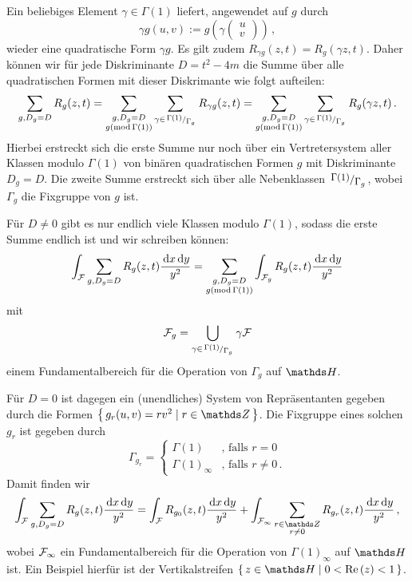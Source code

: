 \begin{bewe}
Ein beliebiges Element $\gamma \in \Gamma(1)$ liefert, angewendet auf $g$ durch
\[
	\gamma g (u, v) := g \left( \gamma \begin{pmatrix}u\\v\end{pmatrix} \right)
	\,,
\]
wieder eine quadratische Form $\gamma g$. Es gilt zudem $R_{\gamma g} (z, t) = R_g (\gamma z, t)$. Daher können wir für jede Diskriminante $D = t^2 - 4m$ die Summe über alle quadratischen Formen mit dieser Diskrimante wie folgt aufteilen:
\[
	\sum_{g, D_g = D} R_g (z, t) = \sum_{\substack{g, D_g = D \\ g (\operatorname{mod} \Gamma(1))}} \sum_{\gamma \in \modulo {\Gamma(1)} {\Gamma_g}} R_{\gamma g} (z,t) = \sum_{\substack{g, D_g = D \\ g (\operatorname{mod} \Gamma(1))}} \sum_{\gamma \in \modulo {\Gamma(1)} {\Gamma_g}} R_g (\gamma z,t)
	\,.
\]
Hierbei erstreckt sich die erste Summe nur noch über ein Vertretersystem aller Klassen modulo $\Gamma(1)$ von binären quadratischen Formen $g$ mit Diskriminante $D_g = D$. Die zweite Summe erstreckt sich über alle Nebenklassen $\modulo {\Gamma(1)}{\Gamma_g}$, wobei $\Gamma_g$ die Fixgruppe von $g$ ist. 

Für $D \neq 0$ gibt es nur endlich viele Klassen modulo $\Gamma(1)$, sodass die erste Summe endlich ist und wir schreiben können:
\begin{equation}\label{eq:intFsumGforDneq0}
	\int_{\mathcal{F}} \sum_{g, D_g = D} R_g(z,t) \frac{\,\mathrm{d} x \,\mathrm{d} y}{y^2} = \sum_{\substack{g, D_g = D \\ g (\operatorname{mod} \Gamma(1))}} \int_{\mathcal{F}_g} R_g (z,t) \frac{\,\mathrm{d} x \,\mathrm{d} y}{y^2}
\end{equation}
mit 
\[
	\F_g = \bigcup_{\gamma \in \modulo {\Gamma(1)}{\Gamma_g}} \gamma \F
\]
einem Fundamentalbereich für die Operation von $\Gamma_g$ auf $\HH$.

Für $D = 0$ ist dagegen ein (unendliches) System von Repräsentanten gegeben durch die Formen $\Set {g_r(u,v) = rv^2 \mid r \in \ZZ }$. Die Fixgruppe eines solchen $g_r$ ist gegeben durch
\[
	\Gamma_{g_r} = \begin{cases} \Gamma(1) &\text{, falls } r = 0\\ \Gamma(1)_\infty &\text{, falls } r \neq 0 \,. \end{cases}
\]
Damit finden wir
\begin{equation}\label{eq:intFsumGforD=0}
	\int_\F \sum_{g, D_g = D} R_g(z,t) \frac{\opd x \opd y}{y^2} = \int_\F R_{g_0} (z,t) \frac{\opd x \opd y}{y^2} + \int_{\F_\infty} \sum_{\substack{r \in \ZZ \\ r \neq 0}} R_{g_r}(z,t) \frac{\opd x \opd y}{y^2}
	\,,
\end{equation}
wobei $\mathcal{F}_\infty$ ein Fundamentalbereich für die Operation von $\Gamma(1)_\infty$ auf $\HH$ ist. Ein Beispiel hierfür ist der Vertikalstreifen $\Set {z \in \HH \mid 0 < \Re (z) < 1}$.


\end{bewe}
